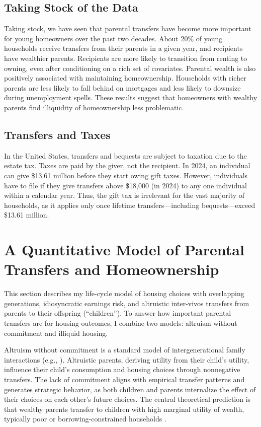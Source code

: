 \documentclass[12pt]{article}
\begin{document}
\subsection{Taking Stock of the Data}
Taking stock, we have seen that parental transfers have become more important for young homeowners over the past two decades. About 20\% of young households receive transfers from their parents in a given year, and recipients have wealthier parents. Recipients are more likely to transition from renting to owning, even after conditioning on a rich set of covariates. Parental wealth is also positively associated with maintaining homeownership. Households with richer parents are less likely to fall behind on mortgages and less likely to downsize during unemployment spells. These results suggest that homeowners with wealthy parents find illiquidity of homeownership less problematic.

\subsection{Transfers and Taxes}
In the United States, transfers and bequests are subject to taxation due to the estate tax. Taxes are paid by the giver, not the recipient. In 2024, an individual can give \$13.61 million before they start owing gift taxes. However, individuals have to file if they give transfers above \$18,000 (in 2024) to any one individual within a calendar year. Thus, the gift tax is irrelevant for the vast majority of households, as it applies only once lifetime transfers---including bequests---exceed \$13.61 million.


\section{A Quantitative Model of Parental Transfers and Homeownership}\label{sec:model}
This section describes my life-cycle model of housing choices with overlapping generations, idiosyncratic earnings risk, and altruistic inter-vivos transfers from parents to their offspring (``children''). To answer how important parental transfers are for housing outcomes, I combine two models: altruism without commitment and illiquid housing. 

Altruism without commitment is a standard model of intergenerational family interactions (e.g., \cite{Altonji1997a,Barczyk2018}). Altruistic parents, deriving utility from their child's utility, influence their child's consumption and housing choices through nonnegative transfers. The lack of commitment aligns with empirical transfer patterns and generates strategic behavior, as both children and parents internalize the effect of their choices on each other's future choices. The central theoretical prediction is that wealthy parents transfer to children with high marginal utility of wealth, typically poor or borrowing-constrained households \citep{Chu2020,Barczyk2020}.
\end{document}
